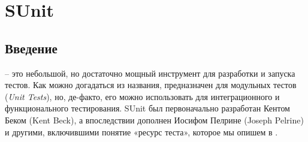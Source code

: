 \documentclass[a4paper,10pt,twoside]{book}
\begin{document}
	\sloppy
\fi
\chapter{SUnit}

\section{Введение}

 – это небольшой, но достаточно мощный инструмент для разработки и запуска тестов.
Как можно догадаться из названия, \sunit предназначен для модульных тестов (\emph{Unit Tests}),
но, де-факто, его можно использовать для интеграционного и функционального тестирования.
SUnit был первоначально разработан Кентом Беком (Kent Beck), а впоследствии дополнен Иосифом Пелрине
(Joseph Pelrine) и другими, включившими понятие «ресурс теста», которое мы опишем в .
\end{document}
